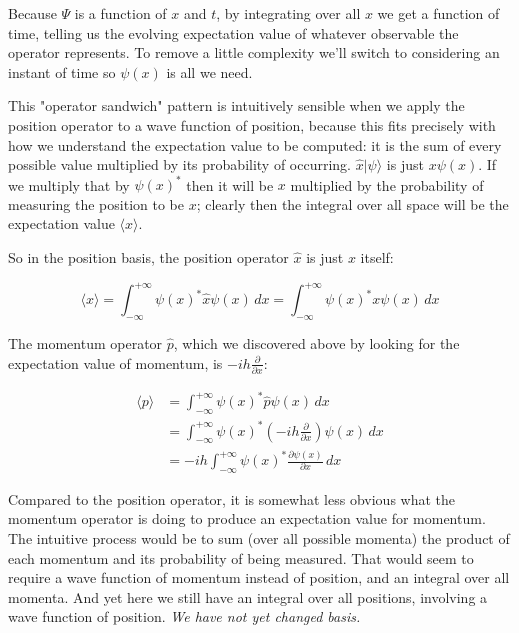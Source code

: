 Because $\Psi$ is a function of $x$ and $t$, by integrating over all $x$ we get a function of time, telling us the evolving expectation value of whatever observable the operator represents. To remove a little complexity we'll switch to considering an instant of time so $\psi(x)$ is all we need.

This "operator sandwich" pattern is intuitively sensible when we apply the position operator to a wave function of position, because this fits precisely with how we understand the expectation value to be computed: it is the sum of every possible value multiplied by its probability of occurring. $\hat{x}|\psi\rangle$ is just $x \psi(x)$. If we multiply that by $\psi(x)^*$ then it will be $x$ multiplied by the probability of measuring the position to be $x$; clearly then the integral over all space will be the expectation value $\langle x \rangle$.

So in the position basis, the position operator $\hat{x}$ is just $x$ itself:

$$
\langle x \rangle =
\int_{-\infty}^{+\infty}
\psi(x)^*
\hat{x}
\psi(x)
\,dx
=
\int_{-\infty}^{+\infty}
\psi(x)^*
x
\psi(x)
\,dx
$$

The momentum operator $\hat{p}$, which we discovered above by looking for the expectation value of momentum, is $-ih\frac{\partial}{\partial x}$:

\begin{equation}
\begin{split}
  \langle p \rangle &=
  \int_{-\infty}^{+\infty}
  \psi(x)^*
  \hat{p}
  \psi(x)
  \,dx 
  \\
  &=
  \int_{-\infty}^{+\infty}
  \psi(x)^*
  (-ih\frac{\partial}{\partial x})
  \psi(x)
  \,dx 
  \\
  &= -ih
  \int_{-\infty}^{+\infty}
  \psi(x)^*
  \frac{\partial \psi(x)}{\partial x}
  \,dx  
\end{split}
\end{equation}

Compared to the position operator, it is somewhat less obvious what the momentum operator is doing to produce an expectation value for momentum. The intuitive process would be to sum (over all possible momenta) the product of each momentum and its probability of being measured. That would seem to require a wave function of momentum instead of position, and an integral over all momenta. And yet here we still have an integral over all positions, involving a wave function of position. \textit{We have not yet changed basis.}

